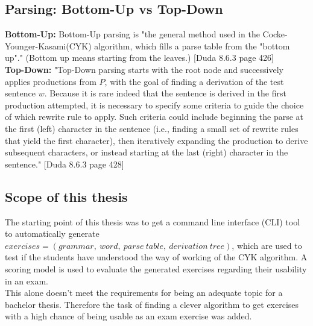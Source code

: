 \subsection{Parsing: Bottom-Up vs Top-Down}

\noindent\textbf{Bottom-Up:} Bottom-Up parsing is "the general method used in the Cocke-Younger-Kasami(CYK) algorithm, which fills a parse table from the "bottom up"." (Bottom up means starting from the leaves.) [Duda 8.6.3 page 426]\\

\noindent\textbf{Top-Down:} "Top-Down parsing starts with the root node and successively applies productions from $P$, with the goal of finding a derivation of the test sentence $w$. Because it is rare indeed that the sentence is derived in the first production attempted, it is necessary to specify some criteria to guide the choice of which rewrite rule to apply. Such criteria could include beginning the parse at the first (left) character in the sentence (i.e., finding a small set of rewrite rules that yield the first character), then iteratively expanding the production to derive subsequent characters, or instead starting at the last (right) character in the sentence." [Duda 8.6.3 page 428]\\

\subsection{Scope of this thesis}

The starting point of this thesis was to get a command line interface (CLI) tool to automatically generate $exercises = (grammar,\ word,\ parse\ table,\ derivation\ tree)$, which are used to test if the students have understood the way of working of the CYK algorithm. A scoring model is used to evaluate the generated exercises regarding their usability in an exam.\\

\noindent This alone doesn't meet the requirements for being an adequate topic for a bachelor thesis.
Therefore the task of finding a clever algorithm to get exercises with a high chance of being usable as an exam exercise was added.\\

\pagebreak